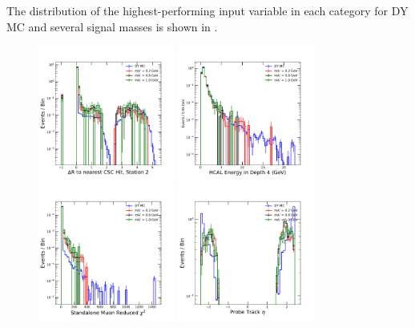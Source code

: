 The distribution of the highest-performing input variable in each category for DY MC and several signal masses is shown in .

\begin{figure}[htpb]
	\centering
	\includegraphics[width=0.4\textwidth]{figures/bdtInputFeatscscDRbyStation_1.pdf}
	\hspace{0.01\textwidth}
	\includegraphics[width=0.4\textwidth]{figures/bdtInputFeatsHEDepth_4.pdf}
	\includegraphics[width=0.4\textwidth]{figures/bdtInputFeatsstaChi.pdf}
	\hspace{0.01\textwidth}
	\includegraphics[width=0.4\textwidth]{figures/bdtInputFeatseta.pdf}

\end{figure}
